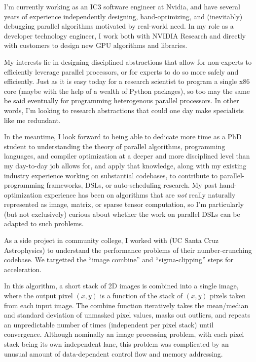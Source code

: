 


\raggedright
\reversemarginpar

I'm currently working as an IC3 software engineer at Nvidia, and have
several years of experience independently designing, hand-optimizing,
and (inevitably) debugging parallel algorithms motivated by real-world
need. In my role as a developer technology engineer, I work both with
NVIDIA Research and directly with customers to design new GPU
algorithms and libraries.

My interests lie in designing disciplined abstractions that allow for
non-experts to efficiently leverage parallel processors, or for
experts to do so more safely and efficiently. Just as it is easy today
for a research scientist to program a single x86 core (maybe with the
help of a wealth of Python packages), so too may the same be said
eventually for programming heterogenous parallel processors. In other
words, I'm looking to research abstractions that could one day make
specialists like me redundant.

In the meantime, I look forward to being able to dedicate more time as
a PhD student to understanding the theory of parallel algorithms,
programming languages, and compiler optimization at a deeper and more
disciplined level than my day-to-day job allows for, and apply that
knowledge, along with my existing industry experience working on
substantial codebases, to contribute to parallel-programming
frameworks, DSLs, or auto-scheduling research. My past
hand-optimization experience has been on algorithms that
are \textit{not} really naturally represented as image, matrix, or
sparse tensor computation, so I'm particularly (but not exclusively)
curious about whether the work on parallel DSLs can be adapted to such
problems.

As a side project in community college, I worked
with  (UC Santa Cruz Astrophysics) to understand the performance
problems of their number-crunching codebase. We targetted the ``image
combine'' and ``sigma-clipping'' steps for acceleration.

In this algorithm, a short stack of 2D images is combined into a
single image, where the output pixel $(x,y)$ is a function of the
stack of $(x,y)$ pixels taken from each input image.  The combine
function iteratively takes the mean/median and standard deviation of
unmasked pixel values, masks out outliers, and repeats an
unpredictable number of times (independent per pixel stack) until
convergence. Although nominally an image processing problem, with each
pixel stack being its own independent lane, this problem was
complicated by an unusual amount of data-dependent control flow and
memory addressing.

